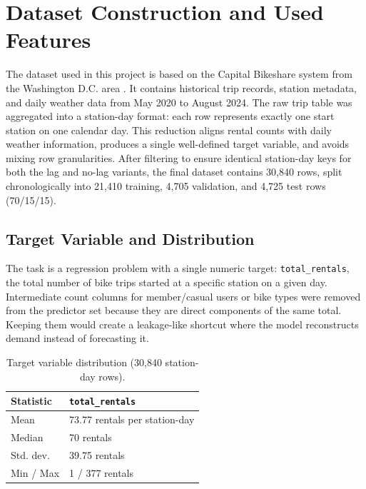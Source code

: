 \section{Dataset Construction and Used Features}
\label{sec:dataset}

The dataset used in this project is based on the Capital Bikeshare system 
from the Washington D.C. area \cite{taweilo_kaggle,capital_system_data}. 
It contains historical trip records, station metadata, and daily weather 
data from May 2020 to August 2024. The raw trip table was aggregated into 
a station-day format: each row represents exactly one start station on one 
calendar day. This reduction aligns rental counts with daily weather 
information, produces a single well-defined target variable, and avoids 
mixing row granularities. After filtering to ensure identical station-day 
keys for both the lag and no-lag variants, the final dataset contains 
30,840 rows, split chronologically into 21,410 training, 4,705 validation, 
and 4,725 test rows (70/15/15).

\subsection{Target Variable and Distribution}

The task is a regression problem with a single numeric target: 
\texttt{total\_rentals}, the total number of bike trips started at a 
specific station on a given day. Intermediate count columns for 
member/casual users or bike types were removed from the predictor set 
because they are direct components of the same total. Keeping them would 
create a leakage-like shortcut where the model reconstructs demand instead 
of forecasting it.

\begin{table}[htbp]
\caption{Target variable distribution (30,840 station-day rows).}
\label{tab:target_dist}
\centering
\scriptsize
\begin{tabularx}{\columnwidth}{p{} X}
\toprule
\textbf{Statistic} & \textbf{\texttt{total\_rentals}} \\
\midrule
Mean        & 73.77 rentals per station-day \\
Median      & 70 rentals \\
Std. dev.   & 39.75 rentals \\
Min / Max   & 1 / 377 rentals \\
\bottomrule
\end{tabularx}
\end{table}

